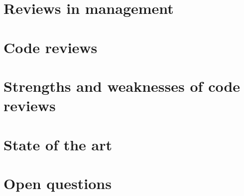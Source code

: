 \section{Reviews in management} \label{sec:litsurvey:reviews}

\section{Code reviews} \label{sec:litsurvey:codeRev}

\section{Strengths and weaknesses of code reviews} \label{sec:litsurvey:strWeak}

\section{State of the art} \label{sec:litsurvey:current}

\section{Open questions}
